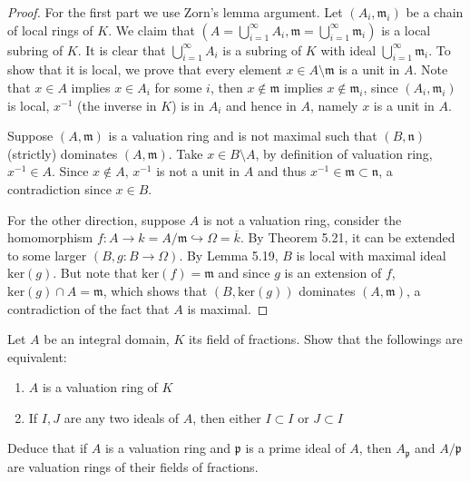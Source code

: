\documentclass{solution}
\begin{document}
\begin{proof}
    For the first part we use Zorn's lemma argument. Let $(A_i, \mathfrak{m}_i)$ be a chain of local rings of $K$. We claim that $(A = \bigcup\limits_{i = 1}^{\infty} A_i, \mathfrak{m} = \bigcup\limits_{i = 1}^{\infty}\mathfrak{m}_i)$ is a local subring of $K$. It is clear that $\bigcup\limits_{i = 1}^{\infty} A_i$ is a subring of $K$ with ideal $\bigcup\limits_{i = 1}^{\infty} \mathfrak{m}_i$. To show that it is local, we prove that every element $x \in A \setminus \mathfrak{m}$ is a unit in $A$. Note that $x \in A$ implies $x \in A_i$ for some $i$, then $x \notin \mathfrak{m}$ implies $x \notin \mathfrak{m}_i$, since $(A_i, \mathfrak{m}_i)$ is local, $x ^{-1}$ (the inverse in $K$) is in $A_i$ and hence in $A$, namely $x$ is a unit in $A$.

    Suppose $(A, \mathfrak{m})$ is a valuation ring and is not maximal such that $(B, \mathfrak{n})$ (strictly) dominates $(A, \mathfrak{m})$. Take $x \in B \setminus A$, by definition of valuation ring, $x ^{-1} \in A$. Since $x \notin A$, $x ^{-1}$ is not a unit in $A$ and thus $x ^{-1} \in \mathfrak{m} \subset \mathfrak{n}$, a contradiction since $x \in B$.

    For the other direction, suppose $A$ is not a valuation ring, consider the homomorphism $f: A \rightarrow k = A / \mathfrak{m} \hookrightarrow \Omega = \overline{k}$. By Theorem 5.21, it can be extended to some larger $(B, g: B \rightarrow \Omega)$. By Lemma 5.19, $B$ is local with maximal ideal $\mathrm{ker}(g)$. But note that $\mathrm{ker}(f) = \mathfrak{m}$ and since $g$ is an extension of $f$, $\mathrm{ker}(g) \cap A = \mathfrak{m}$, which shows that $(B, \mathrm{ker}(g))$ dominates $(A, \mathfrak{m})$, a contradiction of the fact that $A$ is maximal.
\end{proof}

\begin{problem}
    Let $A$ be an integral domain, $K$ its field of fractions. Show that the followings are equivalent:
    \begin{enumerate}
        \item $A$ is a valuation ring of $K$
        \item If $I, J$ are any two ideals of $A$, then either $I \subset I$ or $J \subset I$
    \end{enumerate}
    Deduce that if $A$ is a valuation ring and $\mathfrak{p}$ is a prime ideal of $A$, then $A_{\mathfrak{p}}$ and $A / \mathfrak{p}$ are valuation rings of their fields of fractions.
\end{problem}
\end{document}
